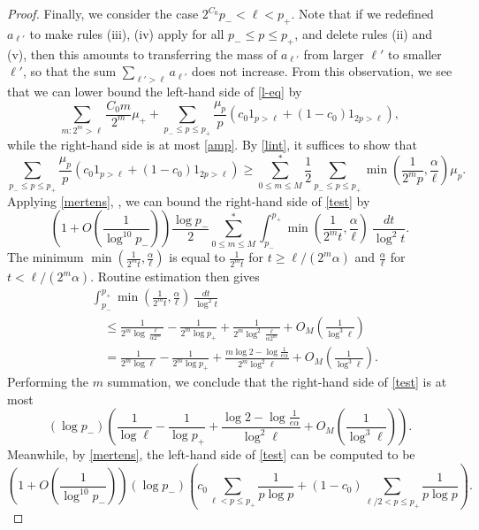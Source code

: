 \documentclass[10pt,a4paper,reqno]{amsart}
\numberwithin{equation}{section}
\theoremstyle{plain}
\theoremstyle{definition}
\begin{document}
\begin{proof}
Finally, we consider the case $2^{C_0} p_- < \ell < p_+$.  
Note that if we redefined $a_{\ell'}$ to make rules (iii), (iv) apply for all $p_- \leq p \leq p_+$, and delete rules (ii) and (v), then this amounts to transferring the mass of $a_{\ell'}$ from larger $\ell'$ to smaller $\ell'$, so that the sum $\sum_{\ell' > \ell} a_{\ell'}$ does not increase.  From this observation, we see that we can lower bound the left-hand side of \eqref{l-eq} by
$$
\sum_{m: 2^m > \ell} \frac{C_0 m}{2^m} \mu_+ + \sum_{p_- \leq p \leq p_+} \frac{\mu_p}{p} \left( c_0 1_{p>\ell} + (1-c_0) 1_{2p>\ell}\right),
$$
while the right-hand side is at most \eqref{amp}.  By \eqref{lint}, it suffices to show that
\begin{equation}\label{test}
\sum_{p_- \leq p \leq p_+} \frac{\mu_p}{p} \left( c_0 1_{p>\ell} + (1-c_0) 1_{2p>\ell}\right)
\geq
\sum_{0 \leq m \leq M}^* \frac{1}{2} \sum_{p_- \leq p \leq p_+} \min\left(\frac{1}{2^mp}, \frac{\alpha}{\ell}\right) \mu_p.
\end{equation}
Applying \eqref{mertens}, , we can bound the right-hand side of \eqref{test} by
$$ \left( 1 + O\left(\frac{1}{\log^{10} p_-}\right)\right) \frac{\log p_-}{2} \sum_{0 \leq m \leq M}^* \int_{p_-}^{p_+} \min\left(\frac{1}{2^m t}, \frac{\alpha}{\ell}\right)\ \frac{dt}{\log^2 t}.$$
The minimum $\min(\frac{1}{2^m t}, \frac{\alpha}{\ell})$ is equal to $\frac{1}{2^m t}$ for $t \geq \ell/(2^m \alpha)$ and $\frac{\alpha}{\ell}$ for $t < \ell/(2^m \alpha)$.  Routine estimation then gives
\begin{align*}
&\int_{p_-}^{p_+} \min(\frac{1}{2^m t}, \frac{\alpha}{\ell})\ \frac{dt}{\log^2 t}\\
&\quad \leq \frac{1}{2^m \log \frac{\ell}{\alpha 2^m}} - \frac{1}{2^m \log p_+} + \frac{1}{2^m \log^2 \frac{\ell}{\alpha 2^m}} + O_M\left( \frac{1}{\log^3 \ell}\right) \\
&\quad =  \frac{1}{2^m \log \ell} - \frac{1}{2^m \log p_+} + \frac{m \log 2 - \log \frac{1}{e\alpha}}{2^m \log^2 \ell} + O_M\left( \frac{1}{\log^3 \ell}\right).
\end{align*}
Performing the $m$ summation, we conclude that the right-hand side of \eqref{test} is at most
$$ (\log p_-) \left(\frac{1}{\log \ell} - \frac{1}{\log p_+} + \frac{\log 2 - \log \frac{1}{e\alpha}}{\log^2 \ell} + O_M\left( \frac{1}{\log^3 \ell}\right) \right).$$
Meanwhile, by \eqref{mertens}, the left-hand side of \eqref{test} can be computed to be
$$
\left( 1 + O\left(\frac{1}{\log^{10} p_-}\right)\right)
(\log p_-) \left( c_0 \sum_{\ell < p \leq p_+} \frac{1}{p \log p} + (1-c_0) \sum_{\ell/2 < p \leq p_+} \frac{1}{p \log p} \right).$$

\end{proof}
\end{document}
